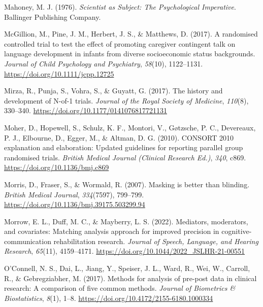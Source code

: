 \documentclass{krantz}
\newlength{\cslhangindent}
\newlength{\cslentryspacingunit} %
\newenvironment{CSLReferences}[2] %
{%
\setlength{\parindent}{0pt}
\ifodd #1
\let\oldpar\par
\def\par{\hangindent=\cslhangindent\oldpar}
\fi
\setlength{\parskip}{#2\cslentryspacingunit}
}%
{}
\begin{document}
\begin{CSLReferences}{1}{0}
\leavevmode{}%
Mahoney, M. J. (1976). \emph{Scientist as {Subject}: {The Psychological Imperative}}. {Ballinger Publishing Company}.

\leavevmode{}%
McGillion, M., Pine, J. M., Herbert, J. S., \& Matthews, D. (2017). A randomised controlled trial to test the effect of promoting caregiver contingent talk on language development in infants from diverse socioeconomic status backgrounds. \emph{Journal of Child Psychology and Psychiatry}, \emph{58}(10), 1122--1131. \url{https://doi.org/10.1111/jcpp.12725}

\leavevmode{}%
Mirza, R., Punja, S., Vohra, S., \& Guyatt, G. (2017). The history and development of {N-of-1} trials. \emph{Journal of the Royal Society of Medicine}, \emph{110}(8), 330--340. \url{https://doi.org/10.1177/0141076817721131}

\leavevmode{}%
Moher, D., Hopewell, S., Schulz, K. F., Montori, V., Gøtzsche, P. C., Devereaux, P. J., Elbourne, D., Egger, M., \& Altman, D. G. (2010). {CONSORT} 2010 explanation and elaboration: Updated guidelines for reporting parallel group randomised trials. \emph{British Medical Journal (Clinical Research Ed.)}, \emph{340}, c869. \url{https://doi.org/10.1136/bmj.c869}

\leavevmode{}%
Morris, D., Fraser, S., \& Wormald, R. (2007). Masking is better than blinding. \emph{British Medical Journal}, \emph{334}(7597), 799--799. \url{https://doi.org/10.1136/bmj.39175.503299.94}

\leavevmode{}%
Morrow, E. L., Duff, M. C., \& Mayberry, L. S. (2022). Mediators, moderators, and covariates: Matching analysis approach for improved precision in cognitive-communication rehabilitation research. \emph{Journal of Speech, Language, and Hearing Research}, \emph{65}(11), 4159--4171. \url{https://doi.org/10.1044/2022_JSLHR-21-00551}

\leavevmode{}%
O'Connell, N. S., Dai, L., Jiang, Y., Speiser, J. L., Ward, R., Wei, W., Carroll, R., \& Gebregziabher, M. (2017). Methods for analysis of pre-post data in clinical research: {A} comparison of five common methods. \emph{Journal of Biometrics \& Biostatistics}, \emph{8}(1), 1--8. \url{https://doi.org/10.4172/2155-6180.1000334}


\end{CSLReferences}
\end{document}
